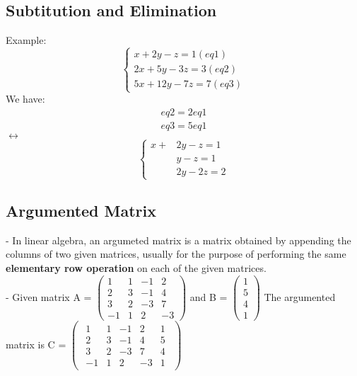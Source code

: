 \documentclass[12pt]{article}
\begin{document}
\subsection{Subtitution and Elimination}
Example: \\
$$
\begin{cases}
x + 2y -z = 1  (eq1)\\
2x + 5y -3z = 3 (eq2)\\
5x + 12y -7z = 7 (eq3)
\end{cases}
$$
\bigbreak
We have: \\
\begin{align*}
eq2 = 2eq1 \\
eq3 = 5eq1
\end{align*}
\bigbreak
$\leftrightarrow$
$$ 
\begin{cases}
x + &2y - z = 1 \\
	&y - z = 1 \\
	&2y -2z = 2
\end{cases}
$$
\subsection{Argumented Matrix}
- In linear algebra, an argumeted matrix is a matrix obtained by appending the columns of two given matrices, usually for the purpose of performing the same \textbf{elementary row operation} on each of the given matrices.\\
- Given matrix A = 
$\begin{pmatrix}
1 & 1 & -1 & 2 \\
2 & 3 & -1 & 4 \\
3 & 2 & -3 & 7 \\
-1 & 1 & 2 & -3
\end{pmatrix}$
and B = 
$\begin{pmatrix}
1 \\
5 \\
4 \\
1
\end{pmatrix}$
\bigbreak
The argumented matrix is C = 
$\begin{pmatrix}
\begin{array}{rrrr|r}
1 & 1 & -1 & 2 & 1 \\
2 & 3 & -1 & 4 & 5 \\
3 & 2 & -3 & 7 & 4 \\
-1 & 1 & 2 & -3 & 1
\end{array}
\end{pmatrix}$
\end{document}
